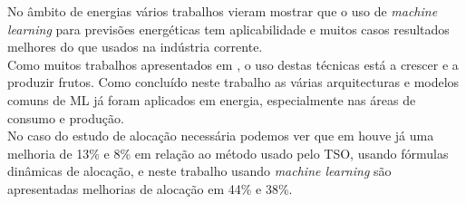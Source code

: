 No âmbito de energias vários trabalhos vieram mostrar que o uso de \textit{machine learning} para previsões energéticas tem aplicabilidade \cite{Stassen} e muitos casos resultados melhores do que usados na indústria corrente. \cite{Ahmad2020} \cite{Antonopoulos2020} \\  
Como muitos trabalhos apresentados em \cite{Benti2023}, o uso destas técnicas está a crescer e a produzir frutos. Como concluído neste trabalho as várias arquitecturas e modelos comuns de ML já foram aplicados em energia, especialmente nas áreas de consumo e produção. \\
No caso do estudo de alocação necessária podemos ver que em \cite{Algarvio2024} houve já uma melhoria de 13\% e 8\% em relação ao método usado pelo TSO, usando fórmulas dinâmicas de alocação, e neste trabalho usando \textit{machine learning} são apresentadas melhorias de alocação em 44\% e 38\%.\\






